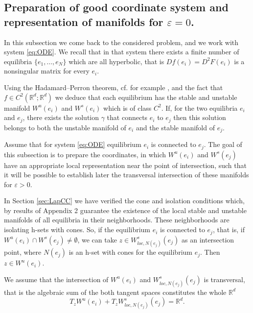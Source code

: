 \documentclass[11pt, leqno]{amsart}
\theoremstyle{definition}
\def\R{\mathbb{R}}
\begin{document}
\subsection{Preparation of good coordinate system and representation of manifolds for $\varepsilon=0$.} 
	

In this subsection we come back to the considered problem, and we work with system \eqref{eq:ODE}. We recall that in that system 
there exists a finite number of equilibria  $\{ e_1,\ldots, e_N\}$ which are all hyperbolic, that is $Df(e_i) = D^2F(e_i)$ is a nonsingular matrix for every $e_i$.

Using the Hadamard--Perron theorem, cf. for example \cite[Theorem 3.2.1]{Guckenheimer}, and the fact that $f\in C^2(\mathbb{R}^d;\mathbb{R}^d)$ we deduce that each equilibrium has the stable and unstable manifold $W^u(e_i)$ and $W^s(e_i)$ which is of class $C^2$.  If, for the two equilibria $e_i$ and $e_j$, there exists the solution $\gamma$ that connects $e_i$ to $e_j$ then this solution
belongs to both the unstable manifold of $e_i$ and the stable manifold of $e_j$.

Assume  that for system \eqref{eq:ODE} equilibrium $e_i$ is connected to $e_j$. The goal of this subsection is to prepare the coordinates, in which  $W^u(e_i)$ and $W^s(e_j)$
have an appropriate local representation near the point of intersection, such that it will be possible to establish later the transversal intersection of these manifolds for $\varepsilon >0$.








In Section \ref{sec:LapCC} we have verified the cone and isolation conditions which, by results of Appendix 2 guarantee the existence of the local stable and unstable manifolds of all equilibria in
 their neighborhoods.  These neighborhoods are isolating h-sets with cones. So, if the equilibrium $e_i$ is connected to $e_j$, that is,  if $W^u(e_i) \cap W^s(e_j) \neq \emptyset$, we can take $z \in W^s_{loc,N(e_j)}(e_j)$ as an intersection point,  where $N(e_j)$ is an h-set with cones for the equilibrium $e_j$. Then  $z \in W^u(e_i)$.

We assume that the intersection of $W^u(e_i)$ and $W^s_{loc,N(e_j)}(e_j)$ is transversal, that is the algebraic sum of the both tangent spaces constitutes the whole $\R^d$ 
$$T_z W^u(e_i) + T_z W^s_{loc,N(e_j)}(e_j) = \mathbb{R}^d.$$
\end{document}
